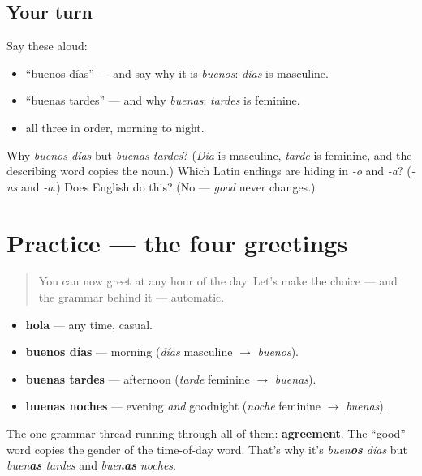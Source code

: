 \subsection*{Your turn}
Say these aloud:

\begin{itemize}
\raggedright
  \item \textquotedblleft{}buenos días\textquotedblright{} — and say why it is \emph{buenos}: \emph{días} is masculine.
  \item \textquotedblleft{}buenas tardes\textquotedblright{} — and why \emph{buenas}: \emph{tardes} is feminine.
  \item all three in order, morning to night.
\end{itemize}

\begin{tcolorbox}[breakable,colback=teal!4,colframe=teal!35!black,title={Before you move on}]
Why \emph{buenos días} but \emph{buenas tardes}? (\emph{Día} is masculine, \emph{tarde} is feminine, and the describing word copies the noun.) Which Latin endings are hiding in \emph{-o} and \emph{-a}? (\emph{-us} and \emph{-a}.) Does English do this? (No — \emph{good} never changes.)
\end{tcolorbox}
\section[Practice]{Practice — the four greetings}

\label{lesson:ES-C02-practice}



\begin{quote}
You can now greet at any hour of the day. Let's make the choice — and the grammar behind it — automatic.
\end{quote}

\begin{grammarlens}[title={What you've built}]
\begin{itemize}
\raggedright
  \item \textbf{hola} — any time, casual.
  \item \textbf{buenos días} — morning (\emph{días} masculine $\to$ \emph{buenos}).
  \item \textbf{buenas tardes} — afternoon (\emph{tarde} feminine $\to$ \emph{buenas}).
  \item \textbf{buenas noches} — evening \emph{and} goodnight (\emph{noche} feminine $\to$ \emph{buenas}).
\end{itemize}

The one grammar thread running through all of them: \textbf{agreement}. The \textquotedblleft{}good\textquotedblright{} word copies the gender of the time-of-day word. That's why it's \emph{buen\textbf{os} días} but \emph{buen\textbf{as} tardes} and \emph{buen\textbf{as} noches}.
\end{grammarlens}

